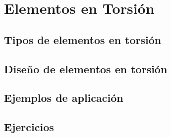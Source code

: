 %
%

\chapter{Elementos en Torsión}
\section{Tipos de elementos en torsión}
\section{Diseño de elementos en torsión}
\section{Ejemplos de aplicación}
\section{Ejercicios}